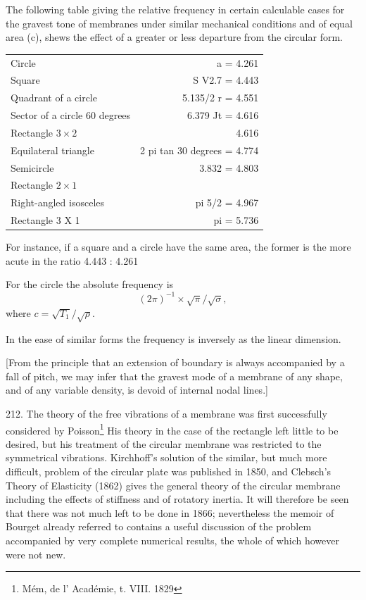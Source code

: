 The following table giving the relative frequency in certain calculable
cases for the gravest tone of membranes under similar mechanical
conditions and of equal area (c), shews the effect of a greater or less
departure from the circular form.

\begin{tabular}{lr}
Circle & a = 4.261  \\
Square & S V2.7 = 4.443\\
Quadrant of a circle & 5.135/2 r = 4.551\\
Sector of a circle 60 degrees  & 6.379 Jt = 4.616\\
Rectangle \( 3 \times 2\) &   4.616\\
Equilateral triangle & 2 pi tan 30 degrees = 4.774\\
Semicircle &  3.832  = 4.803\\
Rectangle \( 2 \times 1\) &  \\
Right-angled isosceles  & pi 5/2 = 4.967\\
Rectangle 3 X 1 & pi = 5.736\\
\end{tabular}

For instance, if a square and a circle have the same area, the
former is the more acute in the ratio 4.443 : 4.261

For the circle the absolute frequency is
\[(2 \pi)^{-1} \times \sqrt{\pi}/\sqrt{\sigma},\]
where \( c=\sqrt{T_1}/\sqrt{\rho}\).

In the ease of similar forms the frequency is inversely as the linear
dimension.

[From the principle that an extension of boundary is always
accompanied by a fall of pitch, we may infer that the gravest
mode of a membrane of any shape, and of any variable density, is
devoid of internal nodal lines.]

212. The theory of the free vibrations of a membrane was first
successfully considered by Poisson\footnote{Mém, de l' Académie, t. VIII. 1829}
His theory in the case of the
rectangle left little to be desired, but his treatment
of the circular membrane was restricted to the symmetrical vibrations.
Kirchhoff's solution of the similar, but much more difficult, problem of
the circular plate was published in 1850, and Clebsch's Theory of
Elasticity (1862) gives the general theory of the circular membrane
including the effects of stiffness and of rotatory inertia. It will
therefore be seen that there was not much left to be done in 1866;
nevertheless the memoir of Bourget already referred to contains a useful
discussion of the problem accompanied by very complete numerical
results, the whole of which however were not new.

